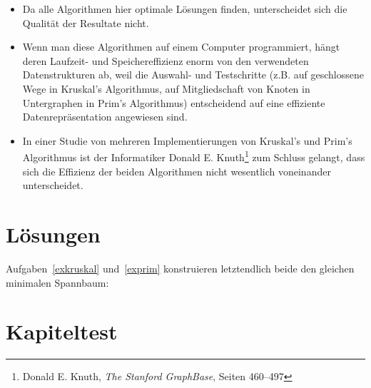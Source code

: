 \documentclass[12pt,a4paper]{report}
\theoremstyle{break}
\theoremstyle{plain}
\begin{document}
\begin{itemize}
\item Da alle Algorithmen hier optimale L\"{o}sungen finden,
  unterscheidet sich die Qualit\"{a}t der Resultate nicht.
\item Wenn man diese Algorithmen auf einem Computer programmiert,
  h\"{a}ngt deren Laufzeit- und Speichereffizienz enorm von den
  verwendeten Datenstrukturen ab, weil die Auswahl- und Testschritte
  (z.B. auf geschlossene Wege in Kruskal's Algorithmus, auf
  Mitgliedschaft von Knoten in Untergraphen in Prim's Algorithmus)
  entscheidend auf eine effiziente Datenrepr\"{a}sentation angewiesen sind.
\item In einer Studie von mehreren Implementierungen von Kruskal's und
  Prim's Algorithmus ist der Informatiker Donald
  E. Knuth\footnote{Donald E. Knuth, \emph{The Stanford GraphBase},
    Seiten 460--497} zum Schluss
  gelangt, dass sich die Effizienz der beiden Algorithmen nicht
  wesentlich voneinander unterscheidet.
\end{itemize}

\section{L\"{o}sungen}

Aufgaben~\ref{exkruskal} und~\ref{exprim} konstruieren letztendlich beide
den gleichen minimalen Spannbaum:


\pagebreak
\section{Kapiteltest}
\end{document}
